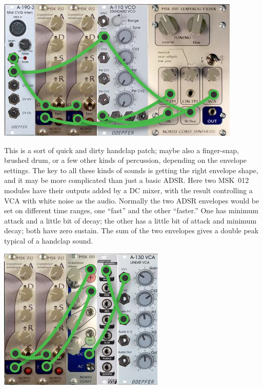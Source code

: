 \nopagebreak\noindent
{\hspace*{\fill}\includegraphics[scale=0.65]{patch2.png}\hspace*{\fill}\par} 

This is a sort of quick and dirty handclap patch; maybe also a finger-snap,
brushed drum, or a few other kinds of percussion, depending on the envelope
settings.  The key to all these kinds of sounds is getting the right
envelope shape, and it may be more complicated than just a basic ADSR.  Here
two MSK~012 modules have their outputs added by a DC mixer, with the result
controlling a VCA with white noise as the audio.  Normally the two ADSR
envelopes would be set on different time ranges, one ``fast'' and the other
``faster.'' One has minimum attack and a little bit of decay; the other has
a little bit of attack and minimum decay; both have zero sustain.  The sum
of the two envelopes gives a double peak typical of a handclap sound.

\nopagebreak\noindent
{\hspace*{\fill}\includegraphics[scale=0.78]{patch3.png}\hspace*{\fill}\par} 

